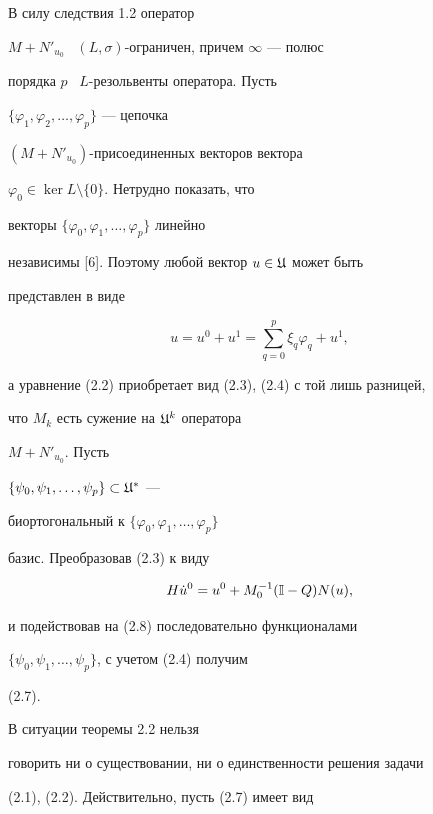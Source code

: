 \begin{pf}


В силу следствия 1.2 оператор


$M+N'_{u_{0}}$ \ $(L,\sigma)$-ограничен, причем $\infty$ --- полюс


порядка $p$ \ $L$-резольвенты оператора. Пусть


$\{\varphi_{1},\varphi_{2},\dotsc,\varphi_{p}\}$ --- цепочка


$(M+N'_{u_{0}})$-присоединенных векторов вектора


$\varphi_{0}\in\ker L\setminus\{0\}$. Нетрудно показать, что


векторы $\{\varphi_{0},\varphi_{1},\dotsc,\varphi_{p}\}$ линейно


независимы [6]. Поэтому любой вектор  $u\in\frak U$ может быть


представлен в виде


$$


u=u^{0}+u^{1}=\sum^{p}_{q=0}\xi_{q}\varphi_{q}+u^{1},


$$


а уравнение (2.2) приобретает вид (2.3), (2.4) с той лишь разницей,


что  $M_{k}$ есть сужение на $\frak U^{k}$ оператора


$M+N'_{u_{0}}$. Пусть


$\{\psi_{0},\psi_{1},\ldots,\psi_{p}\}\subset\frak U^{*}$ ---


биортогональный к $\{\varphi_{0},\varphi_{1},\dotsc,\varphi_{p}\}$


базис. Преобразовав (2.3) к виду


\begin{equation}


H\Dot u{}^{0}=u^{0}+M^{-1}_{0}(\Bbb I-Q)N(u),


\end{equation}


и подействовав на (2.8) последовательно функционалами


$\{\psi_{0},\psi_{1},\ldots,\psi_{p}\}$, с учетом (2.4) получим


(2.7).


\end{pf}





В ситуации теоремы 2.2 нельзя


говорить ни о существовании, ни о единственности решения задачи


(2.1), (2.2). Действительно, пусть (2.7) имеет вид


